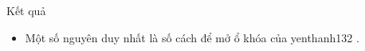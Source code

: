 Kết quả
\begin{itemize}
	\item Một số nguyên duy nhất là số cách để mở ổ khóa của yenthanh132 .
\end{itemize}